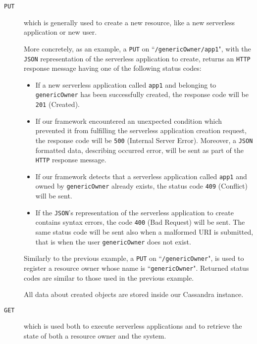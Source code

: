 \documentclass[12pt,a4paper]{report}
\newcommand{\QuoteIntro}{``}
\begin{document}
\begin{description}
	
	\item[\texttt{PUT}] which is generally used to create a new resource, like a new serverless application or new user. 
		
	More concretely, as an example, a \texttt{PUT} on \QuoteIntro\texttt{/genericOwner/app1}", with the \texttt{JSON} representation of the serverless application to create, returns an \texttt{HTTP} response message having one of the following status codes:
	
	\begin{itemize}
		\item If a new serverless application called \texttt{app1} and belonging to \texttt{genericOwner} has been successfully created, the response code will be \texttt{201} (Created).
		
		\item If our framework encountered an unexpected condition which prevented it from fulfilling the serverless application creation request, the response code will be \texttt{500} (Internal Server Error). Moreover, a \texttt{JSON} formatted data, describing occurred error, will be sent as part of the \texttt{HTTP} response message. 
		
		\item If our framework detects that a serverless application called \texttt{app1} and owned by \texttt{genericOwner} already exists, the status code \texttt{409} (Conflict) will be sent.
		
		\item If the \texttt{JSON}'s representation of the serverless application to create contains syntax errors, the code \texttt{400} (Bad Request) will be sent. The same status code will be sent also when a malformed URI is submitted, that is when the user \texttt{genericOwner} does not exist.
		
	\end{itemize}
	
	Similarly to the previous example, a \texttt{PUT} on \QuoteIntro\texttt{/genericOwner}", is used to register a resource owner whose name is \QuoteIntro\texttt{genericOwner}". Returned status codes are similar to those used in the previous example. 
	
	All data about created objects are stored inside our Cassandra instance.
	
	\item[\texttt{GET}]  which is used both to execute serverless applications and to retrieve the state of both a resource owner and the system.
	

\end{description}
\end{document}
